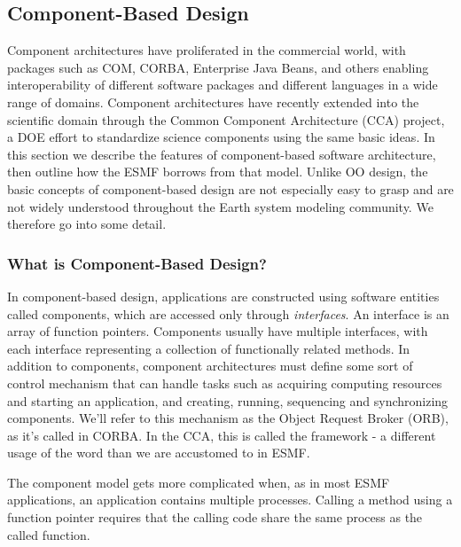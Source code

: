 \subsection{Component-Based Design}

Component architectures have proliferated in the commercial world, with
packages such as COM, CORBA, Enterprise Java Beans, and others enabling 
interoperability
of different software packages and different languages in a wide range
of domains.  Component architectures have recently extended into the 
scientific domain through the Common Component Architecture (CCA) project, a 
DOE effort to standardize science components using the same basic ideas.
In this section we describe the features of component-based software 
architecture, then outline how the ESMF borrows from that model.  Unlike
OO design, the basic concepts of component-based design are not especially
easy to grasp and are not widely understood throughout the Earth system 
modeling community.  We therefore go into some detail.

\subsubsection{What is Component-Based Design?}

In component-based design, applications are constructed using software entities 
called components, which are accessed only through {\it interfaces}.  
An interface is an array of function pointers.  Components usually have multiple 
interfaces, with each interface representing a collection of functionally 
related methods.  In addition to components, component 
architectures must define some sort of control mechanism that can handle tasks 
such as acquiring computing resources and starting an application, 
and creating, running, sequencing and synchronizing components.  We'll refer to
this mechanism as the Object Request Broker (ORB), as it's called in CORBA.  In the 
CCA, this is called the framework - a different usage
of the word than we are accustomed to in ESMF.

The component model gets more complicated when, as in most ESMF applications, 
an application contains multiple processes.  Calling a 
method using a function pointer requires that the calling code share the 
same process as the called function.  

